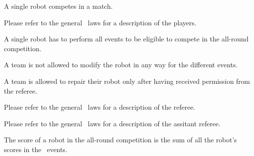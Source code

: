 \documentclass[12pt]{hurocup}
\begin{document}

\begin{lawlist}[RD]
 \item A single robot competes in a match.
\end{lawlist}


Please refer to the general \HuroCup\ laws for a description of
the players.

\begin{lawlist}[ALR]
  
\item A single robot has to perform all events to be eligible to
 compete in the all-round competition.
  
\item A team is not allowed to modify the robot in any way for the
 different events.

\item A team is allowed to repair their robot only after having
 received permission from the referee.
  
\end{lawlist}


Please refer to the general \HuroCup\ laws for a description of
the referee.


Please refer to the general \HuroCup\ laws for a description of
the assitant referee.


\begin{lawlist}[ALR]

\item The score of a robot in the all-round competition is the sum of
 all the robot's scores in the \HuroCup\ events.

\end{lawlist}

\end{document}
